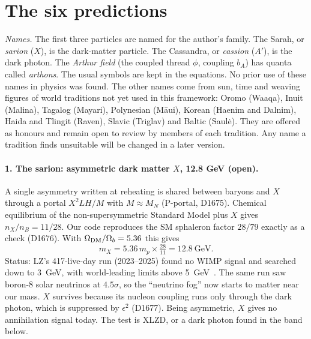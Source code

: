 \documentclass[aps,prd,twocolumn,superscriptaddress,nofootinbib,showkeys]{revtex4-2}
\begin{document}
\section{The six predictions}
\emph{Names.} The first three particles are named for the author's family. The Sarah, or \emph{sarion} ($X$), is the dark-matter particle. The Cassandra, or \emph{cassion} ($A'$), is the dark photon. The \emph{Arthur field} (the coupled thread $\phi$, coupling $b_A$) has quanta called \emph{arthons}. The usual symbols are kept in the equations. No prior use of these names in physics was found. The other names come from sun, time and weaving figures of world traditions not yet used in this framework: Oromo (Waaqa), Inuit (Malina), Tagalog (Mayari), Polynesian (Māui), Korean (Haenim and Dalnim), Haida and Tlingit (Raven), Slavic (Triglav) and Baltic (Saulė). They are offered as honours and remain open to review by members of each tradition. Any name a tradition finds unsuitable will be changed in a later version.
\paragraph*{1. The sarion: asymmetric dark matter $X$, 12.8 GeV (open).}
A single asymmetry written at reheating is shared between baryons and $X$ through a portal $X^2LH/M$ with $M\approx M_N$ (P-portal, D1675). Chemical equilibrium of the non-supersymmetric Standard Model plus $X$ gives $n_X/n_B=11/28$. Our code reproduces the SM sphaleron factor $28/79$ exactly as a check (D1676). With $\Omega_{\rm DM}/\Omega_b=5.36$ this gives
\begin{equation}
m_X=5.36\,m_p\times\tfrac{28}{11}=12.8~\mathrm{GeV}.
\end{equation}
Status: LZ's 417-live-day run (2023--2025) found no WIMP signal and searched down to 3~GeV, with world-leading limits above 5~GeV~\cite{LZ25}. The same run saw boron-8 solar neutrinos at $4.5\sigma$, so the ``neutrino fog'' now starts to matter near our mass. $X$ survives because its nucleon coupling runs only through the dark photon, which is suppressed by $\epsilon^2$ (D1677). Being asymmetric, $X$ gives no annihilation signal today. The test is XLZD, or a dark photon found in the band below.
\end{document}
